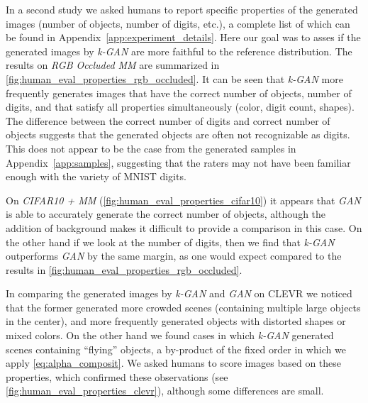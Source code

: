 \documentclass{article}
\begin{document}
In a second study we asked humans to report specific properties of the generated images (number of objects, number of digits, etc.),
a complete list of which can be found in Appendix~\ref{app:experiment_details}.
Here our goal was to asses if the generated images by \emph{k-GAN} are more faithful to the reference distribution.
The results on \emph{RGB Occluded MM} are summarized in \autoref{fig:human_eval_properties_rgb_occluded}.
It can be seen that \emph{k-GAN} more frequently generates images that have the correct number of objects, number of digits, and that satisfy all properties simultaneously (color, digit count, shapes).
The difference between the correct number of digits and correct number of objects suggests that the generated objects are often not recognizable as digits.
This does not appear to be the case from the generated samples in Appendix~\ref{app:samples}, suggesting that the raters may not have been familiar enough with the variety of MNIST digits.

On \emph{CIFAR10 + MM} (\autoref{fig:human_eval_properties_cifar10}) it appears that \emph{GAN} is able to accurately generate the correct number of objects, although the addition of background makes it difficult to provide a comparison in this case.
On the other hand if we look at the number of digits, then we find that \emph{k-GAN} outperforms \emph{GAN} by the same margin, as one would expect compared to the results in \autoref{fig:human_eval_properties_rgb_occluded}.

In comparing the generated images by \emph{k-GAN} and \emph{GAN} on CLEVR we noticed that the former generated more crowded scenes (containing multiple large objects in the center), and more frequently generated objects with distorted shapes or mixed colors.
On the other hand we found cases in which \emph{k-GAN} generated scenes containing ``flying'' objects, a by-product of the fixed order in which we apply \eqref{eq:alpha_composit}.
We asked humans to score images based on these properties, which confirmed these observations (see \autoref{fig:human_eval_properties_clevr}), although some differences are small.
\end{document}
